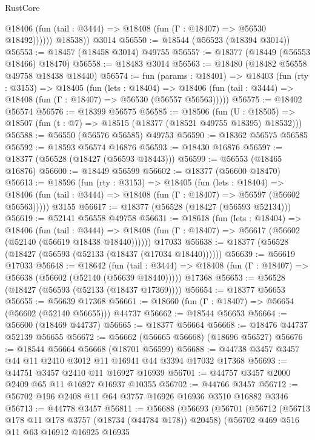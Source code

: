 \begin{lexlean}{RustCore}
\begin{coremodule}
              @18406 (fun (tail : @3444) => @18408 (fun (Γ : @18407) => @56530 @18492))))))
        @18538))
    @3014
@56550 := @18544 (@56523 (@18394 @3014))
@56553 := @18457 (@18458 @3014) @49755
@56557 := @18377 (@18449 (@56553 @18466) @18470)
@56558 := @18483 @3014
@56563 := @18480 (@18482 @56558 @49758 @18438 @18440)
@56574 := fun (params : @18401) =>
  @18403
    (fun (rty : @3153) =>
    @18405
      (fun (lets : @18404) =>
      @18406 (fun (tail : @3444) => @18408 (fun (Γ : @18407) => @56530 (@56557 @56563)))))
@56575 := @18402 @56574
@56576 := @18399 @56575
@56585 := @18506
    (fun (U : @18505) => @18507 (fun (t : @7) => @18515 (@18377 (@18521 @49755 @18395) @18532)))
@56588 := @56550 (@56576 @56585) @49753
@56590 := @18362 @56575 @56585
@56592 := @18593 @56574 @16876
@56593 := @18430 @16876
@56597 := @18377 (@56528 (@18427 (@56593 @18443)))
@56599 := @56553 (@18465 @16876)
@56600 := @18449 @56599
@56602 := @18377 (@56600 @18470)
@56613 := @18596
    (fun (rty : @3153) =>
    @18405
      (fun (lets : @18404) =>
      @18406 (fun (tail : @3444) => @18408 (fun (Γ : @18407) => @56597 (@56602 @56563)))))
    @3155
@56617 := @18377 (@56528 (@18427 (@56593 @52134)))
@56619 := @52141 @56558 @49758
@56631 := @18618
    (fun (lets : @18404) =>
    @18406
      (fun (tail : @3444) =>
      @18408 (fun (Γ : @18407) => @56617 (@56602 (@52140 (@56619 @18438 @18440))))))
    @17033
@56638 := @18377 (@56528 (@18427 (@56593 (@52133 (@18437 (@17034 @18440))))))
@56639 := @56619 @17033
@56648 := @18642
    (fun (tail : @3444) => @18408 (fun (Γ : @18407) => @56638 (@56602 (@52140 (@56639 @18440)))))
    @17368
@56653 := @56528 (@18427 (@56593 (@52133 (@18437 @17369))))
@56654 := @18377 @56653
@56655 := @56639 @17368
@56661 := @18660 (fun (Γ : @18407) => @56654 (@56602 (@52140 @56655))) @44737
@56662 := @18544 @56653
@56664 := @56600 (@18469 @44737)
@56665 := @18377 @56664
@56668 := @18476 @44737 @52139 @56655
@56672 := @56662 (@56665 @56668) (@18696 @56527)
@56676 := @18544 @56664 @56668 (@18701 @56599)
@56688 := @44738 @3457 @3457 @44 @11 @2410 @3012 @11 @16941 @44 @3394 @17032 @17368
@56693 := @44751 @3457 @2410 @11 @16927 @16939
@56701 := @44757 @3457 @2000 @2409 @65 @11 @16927 @16937 @10355
@56702 := @44766 @3457
@56712 := @56702 @196 @2408 @11 @64 @3757 @16926 @16936 @3510 @16882 @3346
@56713 := @44778 @3457
@56811 := @56688
    (@56693
      (@56701
        (@56712
          (@56713 @178 @11 @178 @3757 (@18734 (@44784 @178)) @20458)
          (@56702
            @469
            @516
            @11
            @63
            @16912
            @16925
            @16935

\end{coremodule}
\end{lexlean}
